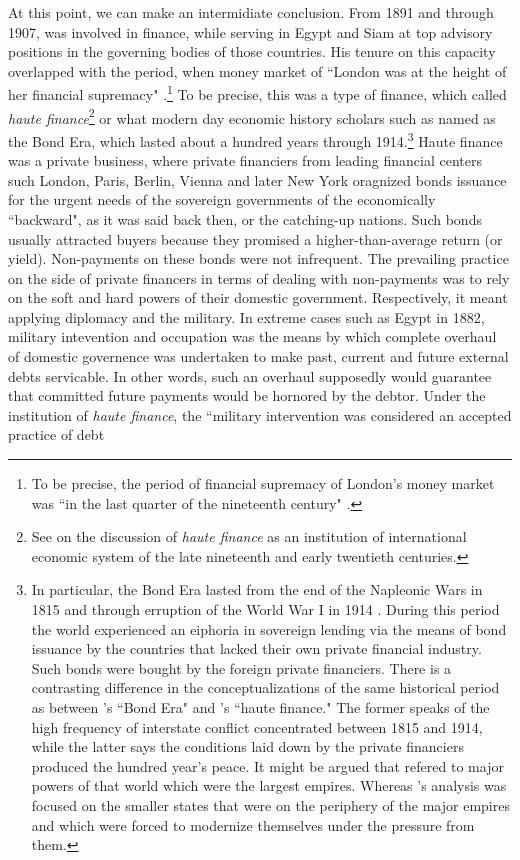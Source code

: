 At this point, we can make an intermidiate conclusion. From 1891 and through 1907, \citeauthor{innes1913} was involved in finance, while serving in Egypt and Siam at top advisory positions in the governing bodies of those countries. His tenure on this capacity overlapped with the period, when money market of ``London was at the height of her financial supremacy" \citep[p.~13]{keynes1971_1}.\footnote{To be precise, the period of financial supremacy of London's money market was ``in the last quarter of the nineteenth century" \citep[p.~13]{keynes1971_1}.} To be precise, this was a type of finance, which \cite{polanyi1944} called \textit{haute finance}\footnote{See \cite[pp.~9-19]{polanyi1944} on the discussion of \textit{haute finance} as an institution of international economic system of the late nineteenth and early twentieth centuries.} or what modern day economic history scholars such as \cite{queralt2022} named as the Bond Era, which lasted about a hundred years through 1914.\footnote{In particular, the Bond Era lasted from the end of the Napleonic Wars in 1815 and through erruption of the World War I in 1914 \citep[p.~3]{queralt2022}. During this period the world experienced an eiphoria in sovereign lending via the means of bond issuance by the countries that lacked their own private financial industry. Such bonds were bought by the foreign private financiers. There is a contrasting difference in the conceptualizations of the same historical period as between \citeauthor{queralt2022}'s ``Bond Era" and \citeauthor{polanyi1944}'s ``haute finance." The former speaks of the high frequency of interstate conflict concentrated between 1815 and 1914, while the latter says the conditions laid down by the private financiers produced the hundred year's peace. It might be argued that \citeauthor{polanyi1944} refered to major powers of that world which were the largest empires. Whereas \citeauthor{queralt2022}'s analysis was focused on the smaller states that were on the periphery of the major empires and which were forced to modernize themselves under the pressure from them.} Haute finance was a private business, where private financiers from leading financial centers such London, Paris, Berlin, Vienna and later New York oragnized bonds issuance for the urgent needs of the sovereign governments of the economically ``backward", as it was said back then, or the catching-up nations. Such bonds usually attracted buyers because they promised a higher-than-average return (or yield). Non-payments on these bonds were not infrequent. The prevailing practice on the side of private financers in terms of dealing with non-payments was to rely on the soft and hard powers of their domestic government. Respectively, it meant applying diplomacy and the military. In extreme cases such as Egypt in 1882, military intevention and occupation was the means by which complete overhaul of domestic governence was undertaken to make past, current and future external debts servicable. In other words, such an overhaul supposedly would guarantee that committed future payments would be hornored by the debtor. Under the institution of \textit{haute finance}, the ``military intervention was considered an accepted practice of debt 